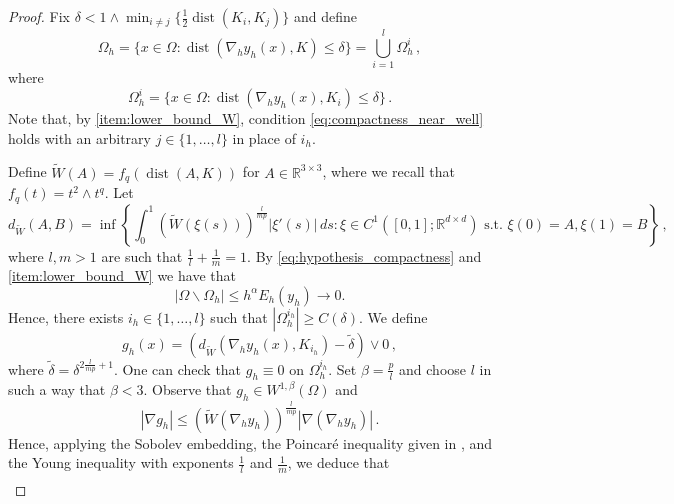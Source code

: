 \documentclass{article}
\theoremstyle{plain}
\theoremstyle{plain}
\theoremstyle{plain}
\theoremstyle{plain}
\theoremstyle{plain}
\theoremstyle{definition}
\theoremstyle{definition}
\renewcommand{\r}{\mathbb{R}}
\DeclareMathOperator{\dist}{dist}
\begin{document}
\begin{proof}
    Fix $\delta < 1 \land \min_{i \neq j}\{\frac{1}{2}\dist(K_i, K_j)\}$ and define
    \[
        \Omega_h = \{x \in \Omega \colon \dist(\nabla_h y_h(x), K) \leq \delta\} = \bigcup_{i = 1}^l \Omega_h^i \,,
    \]
    where
    \begin{equation}
        \Omega_h^i = \{x \in \Omega \colon \dist(\nabla_h y_h(x), K_i) \leq \delta\} \,.
    \end{equation}
    Note that, by \ref{item:lower_bound_W}, condition \eqref{eq:compactness_near_well} holds with an arbitrary $ j \in \{1, \dots, l\} $ in place of $ i_{h} $. 
    
    Define $\widetilde W(A) = f_q(\dist(A, K))$ for $A \in \r^{3 \times 3}$, where we recall that $f_q(t) = t^2 \land t^q$. Let
    \begin{equation}
        d_{\widetilde W}(A, B) = \inf\left\{\int_0^1(\widetilde W(\xi(s)))^{\frac{l}{m p}}|\xi'(s)| \, ds \colon \xi \in C^1([0, 1]; \r^{d \times d}) \text{ s.t. } \xi(0) = A, \xi(1) = B \right\} \,,
    \end{equation}
    where $l, m > 1$ are such that $\frac{1}{l} + \frac{1}{m} = 1$.
    By \eqref{eq:hypothesis_compactness} and \ref{item:lower_bound_W} we have that
    \begin{equation}\label{eq:far_estimate_measure}
        |\Omega \backslash \Omega_h| \leq h^{\alpha}E_{h}(y_{h})\to 0.
    \end{equation}
    Hence, there exists $i_h \in \{1, \dots, l\}$ such that $|\Omega_h^{i_h}| \geq C(\delta)$.
    We define 
    \begin{equation}
        g_h(x) = (d_{\widetilde W}(\nabla_h y_h(x), K_{i_h})  - \tilde \delta) \lor 0 \,,
    \end{equation}
    where $\tilde \delta = \delta^{2 \frac{l}{mp} + 1}$. One can check that $g_h \equiv 0$ on $\Omega_h^{i_h}$. Set $\beta = \frac{p}{l}$ and choose $l$ in such a way that $\beta < 3$.
    Observe that $ g_h \in W^{1, \beta }(\Omega) $ and
    \begin{equation}
        |\nabla g_{h}|\leq(\widetilde W(\nabla_{h}y_{h}))^{\frac{l}{mp}}|\nabla (\nabla_{h}y_{h})| \,.
    \end{equation}
    Hence, applying the Sobolev embedding, the Poincar\'e inequality given in \cite[Lemma 2.2]{ALICANDRO2018}, and the Young inequality with exponents $ \frac{1}{l} $ and $ \frac{1}{m} $, we deduce that
    \begin{equation}\label{eq:estimate_gh}
        \begin{aligned} 

\end{aligned}
\end{equation}
\end{proof}
\end{document}
